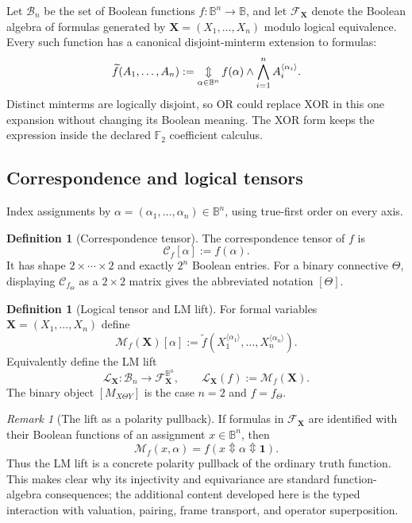 \documentclass[11pt]{article}
\theoremstyle{definition}
\newtheorem{definition}[theorem]{Definition}
\theoremstyle{remark}
\newtheorem{remark}[theorem]{Remark}
\newcommand{\B}{\mathbb B}
\newcommand{\F}{\mathbb F}
\newcommand{\cF}{\mathcal F}
\newcommand{\cC}{\mathcal C}
\newcommand{\cM}{\mathcal M}
\newcommand{\xor}{\mathbin{\Updownarrow}}
\newcommand{\bigxor}{\mathop{\Updownarrow}\displaylimits}
\begin{document}
Let $\mathcal B_n$ be the set of Boolean functions $f:\B^n\to\B$, and let $\cF_{\mathbf X}$ denote the Boolean algebra of formulas generated by $\mathbf X=(X_1,\ldots,X_n)$ modulo logical equivalence.  Every such function has a canonical disjoint-minterm extension to formulas:
\begin{equation}
 \widetilde f(A_1,\ldots,A_n)
 :=\bigxor_{\alpha\in\B^n}
 f(\alpha)\land\bigwedge_{i=1}^n A_i^{\langle\alpha_i\rangle}.
 \label{eq:canonicalterm}
\end{equation}
Distinct minterms are logically disjoint, so OR could replace XOR in this one expansion without changing its Boolean meaning.  The XOR form keeps the expression inside the declared $\F_2$ coefficient calculus.

\subsection{Correspondence and logical tensors}

Index assignments by $\alpha=(\alpha_1,\ldots,\alpha_n)\in\B^n$, using true-first order on every axis.
\begin{definition}[Correspondence tensor]
The correspondence tensor of $f$ is
\begin{equation}
 \cC_f[\alpha]:=f(\alpha).
 \label{eq:ctensor}
\end{equation}
It has shape $2\times\cdots\times2$ and exactly $2^n$ Boolean entries.  For a binary connective $\Theta$, displaying $\cC_{f_\Theta}$ as a $2\times2$ matrix gives the abbreviated notation $[\Theta]$.
\end{definition}

\begin{definition}[Logical tensor and LM lift]
For formal variables $\mathbf X=(X_1,\ldots,X_n)$ define
\begin{equation}
 \cM_f(\mathbf X)[\alpha]
 :=\widetilde f\!\left(X_1^{\langle\alpha_1\rangle},\ldots,
 X_n^{\langle\alpha_n\rangle}\right).
 \label{eq:ltensor}
\end{equation}
Equivalently define the LM lift
\begin{equation}
 \mathcal L_{\mathbf X}:\mathcal B_n\longrightarrow\cF_{\mathbf X}^{\B^n},\qquad
 \mathcal L_{\mathbf X}(f):=\cM_f(\mathbf X).
 \label{eq:lmlift}
\end{equation}
The binary object $[M_{X\Theta Y}]$ is the case $n=2$ and $f=f_\Theta$.
\end{definition}

\begin{remark}[The lift as a polarity pullback]
If formulas in $\cF_{\mathbf X}$ are identified with their Boolean functions of an assignment $x\in\B^n$, then
\begin{equation}
 \cM_f(x,\alpha)=f(x\xor\alpha\xor\mathbf1).
 \label{eq:pullbackform}
\end{equation}
Thus the LM lift is a concrete polarity pullback of the ordinary truth function.  This makes clear why its injectivity and equivariance are standard function-algebra consequences; the additional content developed here is the typed interaction with valuation, pairing, frame transport, and operator superposition.
\end{remark}
\end{document}
